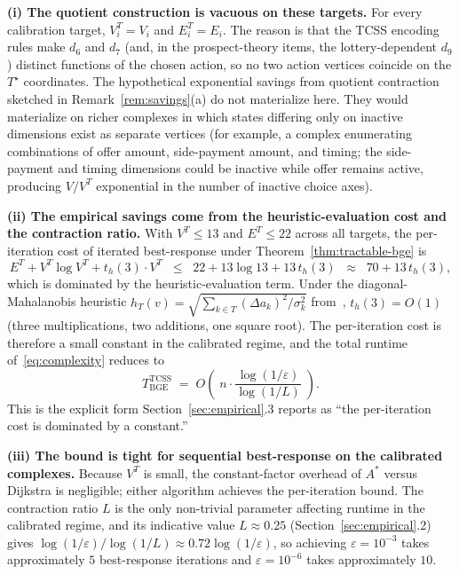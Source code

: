 \documentclass[11pt]{article}
\theoremstyle{definition}
\theoremstyle{remark}
\begin{document}
\textbf{(i) The quotient construction is vacuous on these targets.}
For every calibration target, $V_i^T = V_i$ and $E_i^T = E_i$. The reason is that the TCSS
encoding rules make $d_6$ and $d_7$ (and, in the prospect-theory items, the lottery-dependent
$d_9$) distinct functions of the chosen action, so no two action vertices coincide on the
$T^\star$ coordinates. The hypothetical exponential savings from quotient contraction sketched in
Remark~\ref{rem:savings}(a) do not materialize here. They would materialize on richer complexes
in which states differing only on inactive dimensions exist as separate vertices (for example, a
complex enumerating combinations of offer amount, side-payment amount, and timing; the side-payment
and timing dimensions could be inactive while offer remains active, producing $V/V^T$ exponential
in the number of inactive choice axes).

\textbf{(ii) The empirical savings come from the heuristic-evaluation cost and the contraction
ratio.} With $V^T \leq 13$ and $E^T \leq 22$ across all targets, the per-iteration cost of
iterated best-response under Theorem~\ref{thm:tractable-bge} is
\[
E^T + V^T \log V^T + t_h(3) \cdot V^T
\;\;\leq\;\;
22 + 13 \log 13 + 13\, t_h(3)
\;\;\approx\;\;
70 + 13\, t_h(3),
\]
which is dominated by the heuristic-evaluation term. Under the diagonal-Mahalanobis heuristic
$h_T(v) = \sqrt{\sum_{k \in T} (\Delta a_k)^2/\sigma_k^2}$ from~\cite{bond2026tcss}, $t_h(3) = O(1)$
(three multiplications, two additions, one square root). The per-iteration cost is therefore a
small constant in the calibrated regime, and the total runtime of~\eqref{eq:complexity} reduces to
\[
T_{\mathrm{BGE}}^{\mathrm{TCSS}}
\;=\;
O\!\left(\; n \cdot \frac{\log(1/\varepsilon)}{\log(1/L)} \;\right).
\]
This is the explicit form Section~\ref{sec:empirical}.3 reports as ``the per-iteration cost is
dominated by a constant.''

\textbf{(iii) The bound is tight for sequential best-response on the calibrated complexes.}
Because $V^T$ is small, the constant-factor overhead of $A^*$ versus Dijkstra is negligible; either
algorithm achieves the per-iteration bound. The contraction ratio $L$ is the only non-trivial
parameter affecting runtime in the calibrated regime, and its indicative value $L \approx 0.25$
(Section~\ref{sec:empirical}.2) gives $\log(1/\varepsilon)/\log(1/L) \approx 0.72 \log(1/\varepsilon)$,
so achieving $\varepsilon = 10^{-3}$ takes approximately $5$ best-response iterations and
$\varepsilon = 10^{-6}$ takes approximately $10$.
\end{document}

